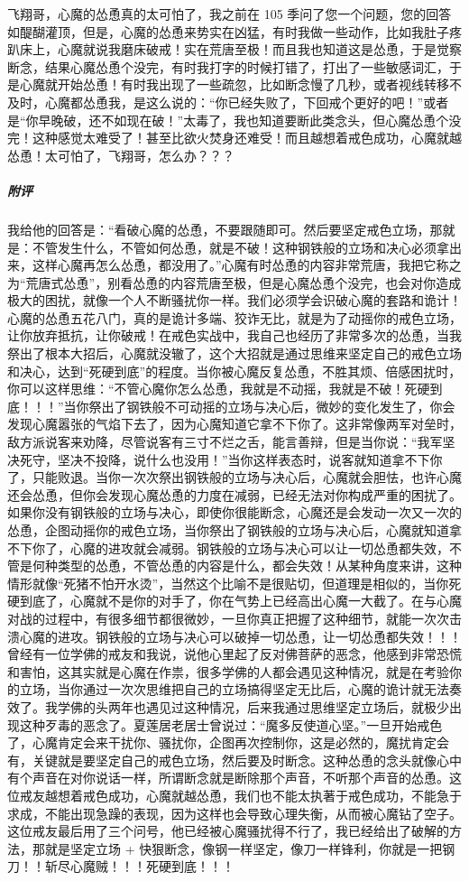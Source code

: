 \begin{case}
    飞翔哥，心魔的怂恿真的太可怕了，我之前在 105 季问了您一个问题，您的回答如醍醐灌顶，但是，心魔的怂恿来势实在凶猛，有时我做一些动作，比如我肚子疼趴床上，心魔就说我磨床破戒！实在荒唐至极！而且我也知道这是怂恿，于是觉察断念，结果心魔怂恿个没完，有时我打字的时候打错了，打出了一些敏感词汇，于是心魔就开始怂恿！有时我出现了一些疏忽，比如断念慢了几秒，或者视线转移不及时，心魔都怂恿我，是这么说的：“你已经失败了，下回戒个更好的吧！”或者是“你早晚破，还不如现在破！”太毒了，我也知道要断此类念头，但心魔怂恿个没完！这种感觉太难受了！甚至比欲火焚身还难受！而且越想着戒色成功，心魔就越怂恿！太可怕了，飞翔哥，怎么办？？？
    \subparagraph{附评} 我给他的回答是：“看破心魔的怂恿，不要跟随即可。然后要坚定戒色立场，那就是：不管发生什么，不管如何怂恿，就是不破！这种钢铁般的立场和决心必须拿出来，这样心魔再怎么怂恿，都没用了。”心魔有时怂恿的内容非常荒唐，我把它称之为“荒唐式怂恿”，别看怂恿的内容荒唐至极，但是心魔怂恿个没完，也会对你造成极大的困扰，就像一个人不断骚扰你一样。我们必须学会识破心魔的套路和诡计！心魔的怂恿五花八门，真的是诡计多端、狡诈无比，就是为了动摇你的戒色立场，让你放弃抵抗，让你破戒！在戒色实战中，我自己也经历了非常多次的怂恿，当我祭出了根本大招后，心魔就没辙了，这个大招就是通过思维来坚定自己的戒色立场和决心，达到“死硬到底”的程度。当你被心魔反复怂恿，不胜其烦、倍感困扰时，你可以这样思维：“不管心魔你怎么怂恿，我就是不动摇，我就是不破！死硬到底！！！”当你祭出了钢铁般不可动摇的立场与决心后，微妙的变化发生了，你会发现心魔嚣张的气焰下去了，因为心魔知道它拿不下你了。这非常像两军对垒时，敌方派说客来劝降，尽管说客有三寸不烂之舌，能言善辩，但是当你说：“我军坚决死守，坚决不投降，说什么也没用！”当你这样表态时，说客就知道拿不下你了，只能败退。当你一次次祭出钢铁般的立场与决心后，心魔就会胆怯，也许心魔还会怂恿，但你会发现心魔怂恿的力度在减弱，已经无法对你构成严重的困扰了。如果你没有钢铁般的立场与决心，即使你很能断念，心魔还是会发动一次又一次的怂恿，企图动摇你的戒色立场，当你祭出了钢铁般的立场与决心后，心魔就知道拿不下你了，心魔的进攻就会减弱。钢铁般的立场与决心可以让一切怂恿都失效，不管是何种类型的怂恿，不管怂恿的内容是什么，都会失效！从某种角度来讲，这种情形就像“死猪不怕开水烫”，当然这个比喻不是很贴切，但道理是相似的，当你死硬到底了，心魔就不是你的对手了，你在气势上已经高出心魔一大截了。在与心魔对战的过程中，有很多细节都很微妙，一旦你真正把握了这种细节，就能一次次击溃心魔的进攻。钢铁般的立场与决心可以破掉一切怂恿，让一切怂恿都失效！！！曾经有一位学佛的戒友和我说，说他心里起了反对佛菩萨的恶念，他感到非常恐慌和害怕，这其实就是心魔在作祟，很多学佛的人都会遇见这种情况，就是在考验你的立场，当你通过一次次思维把自己的立场搞得坚定无比后，心魔的诡计就无法奏效了。我学佛的头两年也遇见过这种情况，后来我通过思维坚定立场后，就极少出现这种歹毒的恶念了。夏莲居老居士曾说过：“魔多反使道心坚。”一旦开始戒色了，心魔肯定会来干扰你、骚扰你，企图再次控制你，这是必然的，魔扰肯定会有，关键就是要坚定自己的戒色立场，然后要及时断念。这种怂恿的念头就像心中有个声音在对你说话一样，所谓断念就是断除那个声音，不听那个声音的怂恿。这位戒友越想着戒色成功，心魔就越怂恿，我们也不能太执著于戒色成功，不能急于求成，不能出现急躁的表现，因为这样也会导致心理失衡，从而被心魔钻了空子。这位戒友最后用了三个问号，他已经被心魔骚扰得不行了，我已经给出了破解的方法，那就是坚定立场 + 快狠断念，像钢一样坚定，像刀一样锋利，你就是一把钢刀！！斩尽心魔贼！！！死硬到底！！！
\end{case}

